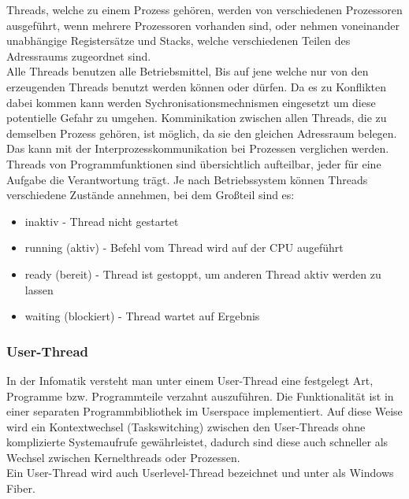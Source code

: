 \documentclass[12pt,a4paper]{report}
\begin{document}
Threads, welche zu einem Prozess gehören, werden von verschiedenen Prozessoren ausgeführt, wenn mehrere Prozessoren vorhanden sind, oder nehmen voneinander unabhängige Registersätze und Stacks, welche verschiedenen Teilen des Adressraums zugeordnet sind.\\

Alle Threads benutzen alle Betriebsmittel, Bis auf jene welche nur von den erzeugenden Threads benutzt werden können oder dürfen. Da es zu Konflikten dabei kommen kann werden Sychronisationsmechnismen eingesetzt um diese potentielle Gefahr zu umgehen.
Komminikation zwischen allen Threads, die zu demselben Prozess gehören, ist möglich, da sie den gleichen Adressraum belegen. Das kann mit der Interprozesskommunikation bei Prozessen verglichen werden.\\

Threads von Programmfunktionen sind übersichtlich aufteilbar, jeder für eine Aufgabe die Verantwortung trägt. Je nach Betriebssystem können Threads verschiedene Zustände annehmen, bei dem Großteil sind es: 
\begin{itemize}
\item inaktiv -  Thread nicht gestartet
\item running (aktiv) - Befehl vom Thread wird auf der CPU augeführt
\item ready (bereit) - Thread ist gestoppt, um anderen Thread aktiv werden zu lassen
\item waiting (blockiert) - Thread wartet auf Ergebnis
\end{itemize}

\subsubsection{User-Thread}
In der Infomatik versteht man unter einem User-Thread eine festgelegt Art, Programme bzw. Programmteile verzahnt auszuführen. Die Funktionalität ist in einer separaten Programmbibliothek im Userspace implementiert. Auf diese Weise wird ein Kontextwechsel (Taskswitching) zwischen den User-Threads ohne komplizierte Systemaufrufe gewährleistet, dadurch sind diese auch schneller als Wechsel zwischen Kernelthreads oder Prozessen.\\
Ein User-Thread wird auch Userlevel-Thread bezeichnet und unter als Windows Fiber.

\end{document}
